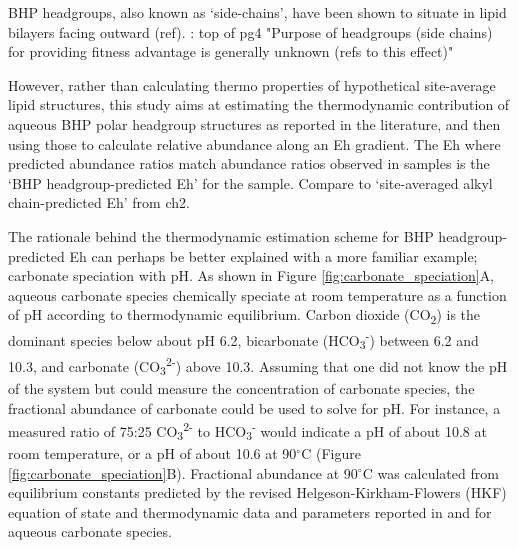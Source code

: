 BHP headgroups, also known as `side-chains', have been shown to situate in lipid bilayers facing outward (ref).
\citep{belin2018hopanoid}: top of pg4 "Purpose of headgroups (side chains) for providing fitness advantage is generally unknown (refs to this effect)"



However, rather than calculating thermo properties of hypothetical site-average lipid structures, this study aims at estimating the thermodynamic contribution of aqueous BHP polar headgroup structures as reported in the literature, and then using those to calculate relative abundance along an Eh gradient. The Eh where predicted abundance ratios match abundance ratios observed in samples is the `BHP headgroup-predicted Eh' for the sample. Compare to `site-averaged alkyl chain-predicted Eh' from ch2.

The rationale behind the thermodynamic estimation scheme for BHP headgroup-predicted Eh can perhaps be better explained with a more familiar example; carbonate speciation with pH. As shown in Figure \ref{fig:carbonate_speciation}A, aqueous carbonate species chemically speciate at room temperature as a function of pH according to thermodynamic equilibrium. Carbon dioxide (CO\textsubscript{2}) is the dominant species below about pH 6.2, bicarbonate (HCO\textsubscript{3}\textsuperscript{-}) between 6.2 and 10.3, and carbonate (CO\textsubscript{3}\textsuperscript{2-}) above 10.3. Assuming that one did not know the pH of the system but could measure the concentration of carbonate species, the fractional abundance of carbonate could be used to solve for pH. For instance, a measured ratio of 75:25 CO\textsubscript{3}\textsuperscript{2-} to HCO\textsubscript{3}\textsuperscript{-} would indicate a pH of about 10.8 at room temperature, or a pH of about 10.6 at 90$^{\circ}$C (Figure \ref{fig:carbonate_speciation}B). Fractional abundance at 90$^{\circ}$C was calculated from equilibrium constants predicted by the revised Helgeson-Kirkham-Flowers (HKF) equation of state \citep{shock1992calculation} and thermodynamic data and parameters reported in \cite{shock1988calculation} and \cite{plyasunov2001correlation} for aqueous carbonate species.


